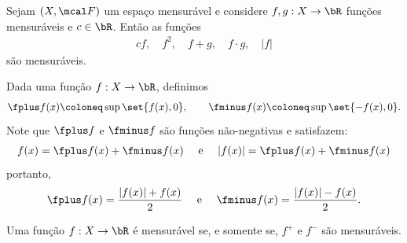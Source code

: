 \begin{prop*}{}
  Sejam $(X, \mcal F)$ um espaço mensurável e considere $f, g: X \rightarrow \bR$
  funções mensuráveis e $c \in \bR$. Então as funções 
  \begin{align*}
    cf, \quad f^2, \quad f+g, \quad f\cdot g, \quad |f|
  \end{align*}
  são mensuráveis.
\end{prop*}


Dada uma função $f: X \rightarrow \bR$, definimos
\begin{align*}
  \fplus f(x) \coloneq \sup\set{f(x), 0}, \quad\quad \fminus f(x)\coloneq \sup\set{-f(x),0}.
\end{align*}
Note que $\fplus f$ e $\fminus f$ são funções não-negativas e satisfazem:
\begin{align*}
  f(x) = \fplus f(x) + \fminus f(x) \quad \text{ e }\quad |f(x)| = \fplus f(x) + \fminus f(x)
\end{align*}
portanto, 
\begin{align*}
  \fplus f(x) = \frac{|f(x)| +f(x)}{2} \quad \text{ e }\quad 
  \fminus f(x) = \frac{|f(x)| - f(x)}{2}.
\end{align*}
\begin{corollary*}{}
  Uma função $f: X \rightarrow \bR$ é mensurável se, e somente se, $f^+$ e $f^-$ são mensuráveis.
\end{corollary*}
